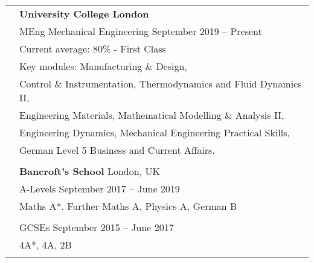\documentclass[letterpaper, 11pt]{article}
\begin{document}
\begin{longtable}{p{1.3in}p{4.8in}}




\color{OliveGreen}{Education} 
& \textbf{University College London} \\ 
& MEng Mechanical Engineering \hfill September 2019 -- Present \\
&  Current average: 80\% - First Class \\
& Key modules: Manufacturing \& Design, \\
& Control \& Instrumentation, Thermodynamics and Fluid Dynamics II, \\
& Engineering Materials, Mathematical Modelling \& Analysis II, \\
& Engineering Dynamics, Mechanical Engineering Practical Skills,\\ 
& German Level 5 Business and Current Affairs.\\
& \\

& \textbf{Bancroft's School} \hfill London, UK \\
& A-Levels \hfill September 2017 -- June 2019\\
& Maths A*. Further Maths A, Physics A, German B\\
& \\
& GCSEs \hfill September 2015 -- June 2017 \\
& 4A*, 4A, 2B\\
& \\




\end{longtable}
\end{document}
